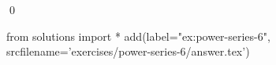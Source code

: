 \begin{ex}
  \label{ex:power-series-6}
  
  \qed
\end{ex}
\begin{python0}
from solutions import *
add(label="ex:power-series-6",
    srcfilename='exercises/power-series-6/answer.tex') 
\end{python0}                              
